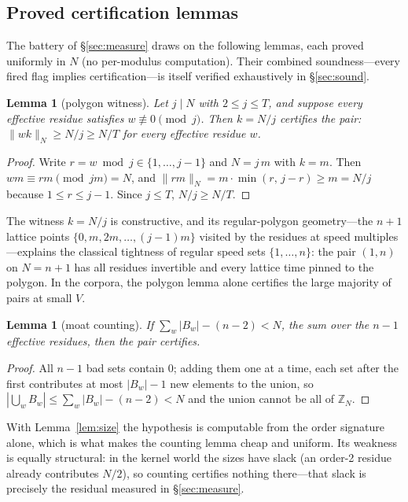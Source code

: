 \documentclass[11pt,a4paper]{article}
\numberwithin{equation}{section}
\theoremstyle{plain}
\newtheorem{lemma}[theorem]{Lemma}
\theoremstyle{definition}
\theoremstyle{remark}
\newcommand{\Z}{\mathbb{Z}}
\newcommand{\wn}[1]{\lVert #1 \rVert_{N}}
\begin{document}
\subsection{Proved certification lemmas}

The battery of \S\ref{sec:measure} draws on the following lemmas, each
proved uniformly in $N$ (no per-modulus computation). Their combined
soundness---every fired flag implies certification---is itself verified
exhaustively in \S\ref{sec:sound}.

\begin{lemma}[polygon witness]\label{lem:jgon}
Let $j\mid N$ with $2\le j\le T$, and suppose every effective residue
satisfies $w\not\equiv 0\pmod j$. Then $k=N/j$ certifies the pair:
$\wn{wk}\ge N/j\ge N/T$ for every effective residue $w$.
\end{lemma}

\begin{proof}
Write $r=w\bmod j\in\{1,\dots,j-1\}$ and $N=j\,m$ with $k=m$. Then
$wm\equiv rm\pmod{jm}=N$, and
$\wn{rm}=m\cdot\min(r,\,j-r)\ge m=N/j$ because
$1\le r\le j-1$. Since $j\le T$, $N/j\ge N/T$.
\end{proof}

The witness $k=N/j$ is constructive, and its regular-polygon
geometry---the $n{+}1$ lattice points $\{0,m,2m,\dots,(j{-}1)m\}$ visited
by the residues at speed multiples---explains the classical tightness of
regular speed sets $\{1,\dots,n\}$: the pair $(1,n)$ on $N=n+1$ has all
residues invertible and every lattice time pinned to the polygon. In the
corpora, the polygon lemma alone certifies the large majority of pairs at
small $V$.

\begin{lemma}[moat counting]\label{lem:counting}
If $\sum_w |B_w|-(n-2)<N$, the sum over the $n-1$ effective residues, then
the pair certifies.
\end{lemma}

\begin{proof}
All $n-1$ bad sets contain $0$; adding them one at a time, each set after
the first contributes at most $|B_w|-1$ new elements to the union, so
$|\bigcup_w B_w|\le \sum_w|B_w|-(n-2)<N$ and the union cannot be all of
$\Z_N$.
\end{proof}

With Lemma~\ref{lem:size} the hypothesis is computable from the order
signature alone, which is what makes the counting lemma cheap and uniform.
Its weakness is equally structural: in the kernel world the sizes have
slack (an order-2 residue already contributes $N/2$), so counting certifies
nothing there---that slack is precisely the residual measured in
\S\ref{sec:measure}.
\end{document}
